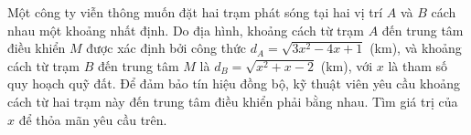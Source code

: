 \setcounter{vd}{0}
\begin{vd}%
	Một công ty viễn thông muốn đặt hai trạm phát sóng tại hai vị trí $A$ và $B$ cách nhau một khoảng nhất định. Do địa hình, khoảng cách từ trạm $A$ đến trung tâm điều khiển $M$ được xác định bởi công thức $d_A = \sqrt{3x^2 - 4x + 1}$ (km), và khoảng cách từ trạm $B$ đến trung tâm $M$ là $d_B = \sqrt{x^2 + x - 2}$ (km), với $x$ là tham số quy hoạch quỹ đất. Để đảm bảo tín hiệu đồng bộ, kỹ thuật viên yêu cầu khoảng cách từ hai trạm này đến trung tâm điều khiển phải bằng nhau. Tìm giá trị của $x$ để thỏa mãn yêu cầu trên.
\end{vd}
